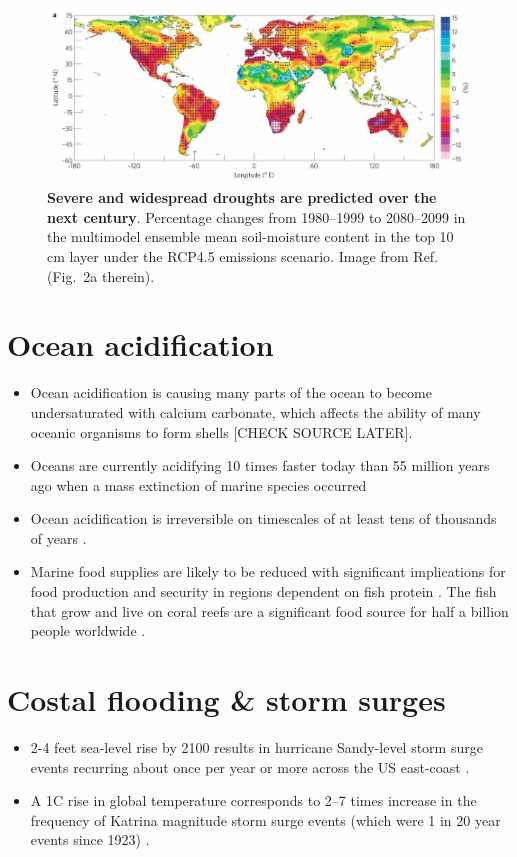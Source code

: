 \documentclass[11pt]{article}
\begin{document}
\begin{figure}
\centerline{\includegraphics[width=\columnwidth]{Figures/Dai13_fig2a.png}}
\caption{\textbf{Severe and widespread droughts are predicted over the next century}. Percentage changes from 1980--1999 to 2080--2099 in the multimodel ensemble mean soil-moisture content in the top 10 cm layer under the RCP4.5 emissions scenario. Image from Ref.~\cite{Dai13} (Fig.~2a therein).} 
\label{Fig:drought_Dai}
\end{figure}

\section{Ocean acidification}
\begin{itemize}
\item Ocean acidification is causing many parts of the ocean to become undersaturated with calcium carbonate, which affects the ability of many oceanic organisms to form shells \cite{NOAA_ocean_acid} [CHECK SOURCE LATER].
\item Oceans are currently acidifying 10 times faster today than 55 million years ago when a mass extinction of marine species occurred \cite{Ridgwell10,Romm18}
\item Ocean acidification is irreversible on timescales of at least tens of thousands of years \cite{IAP09}.
\item Marine food supplies are likely to be reduced with significant implications for food production and security in regions dependent on fish protein \cite{IAP09}. The fish that grow and live on coral reefs are a significant food source for half a billion people worldwide \cite{Romm18}. 
\end{itemize}

\section{Costal flooding \& storm surges} \label{sec:flood_ss}
\begin{itemize}
\item 2-4 feet sea-level rise by 2100 results in hurricane Sandy-level storm surge events recurring about once per year or more across the US east-coast \cite{Sweet13}.
\item A 1\textdegree{}C rise in global temperature corresponds to 2--7 times increase in the frequency of Katrina magnitude storm surge events (which were 1 in 20 year events since 1923) \cite{Grinsted13}.
\end{itemize}
\end{document}
